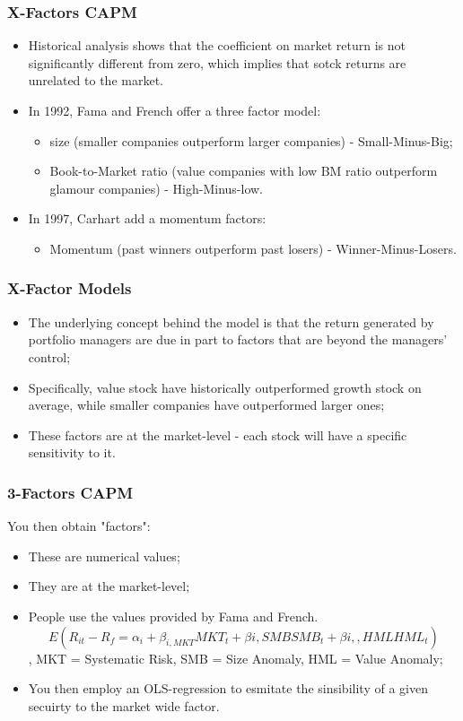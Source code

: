 \documentclass[11pt,a4paper]{report}
\begin{document}
\subsubsection{X-Factors CAPM}
\begin{itemize}
    \item Historical analysis shows that the coefficient on market return is not significantly different from zero, which implies that sotck returns are unrelated to the market.
    \item In 1992, Fama and French offer a three factor model:
    \begin{itemize}
        \item size (smaller companies outperform larger companies) - Small-Minus-Big;
        \item Book-to-Market ratio (value companies with low BM ratio outperform glamour companies) - High-Minus-low.
    \end{itemize}
    \item In 1997, Carhart add a momentum factors:
    \begin{itemize}
        \item Momentum (past winners outperform past losers) - Winner-Minus-Losers.
    \end{itemize}
\end{itemize}
\subsubsection{X-Factor Models}
\begin{itemize}
    \item The underlying concept behind the model is that the return generated by portfolio managers are due in part to factors that are beyond the managers' control;
    \item Specifically, value stock have historically outperformed growth stock on average, while smaller companies have outperformed larger ones;
    \item These factors are at the market-level - each stock will have a specific sensitivity to it.
\end{itemize}
\subsubsection{3-Factors CAPM}
You then obtain "factors":
\begin{itemize}
    \item These are numerical values;
    \item They are at the market-level;
    \item People use the values provided by Fama and French.
    \[E(R_{it} - R_f = \alpha_i + \beta_{i,MKT}MKT_t + \beta{i,SMB} SMB_t + \beta{i,,HML} HML_t)\] , MKT = Systematic Risk, SMB = Size Anomaly, HML = Value Anomaly;
    \item You then employ an OLS-regression to esmitate the sinsibility of a given secuirty to the market wide factor.
\end{itemize}
\end{document}
